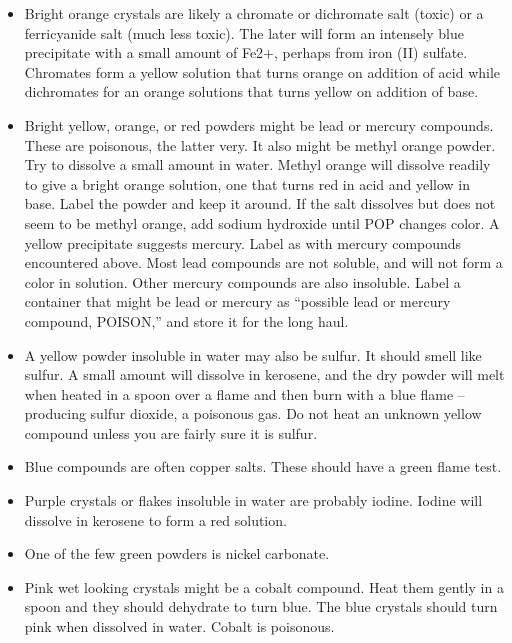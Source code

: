 \begin{itemize}

\item{Bright orange crystals are likely a chromate 
or dichromate salt (toxic) or a ferricyanide salt (much less toxic). 
The later will form an intensely blue precipitate 
with a small amount of Fe2+, 
perhaps from iron (II) sulfate. 
Chromates form a yellow solution that turns orange 
on addition of acid while dichromates for an orange solutions 
that turns yellow on addition of base.}

\item{Bright yellow, 
orange, 
or red powders might be lead or mercury compounds. 
These are poisonous, 
the latter very. 
It also might be methyl orange powder. 
Try to dissolve a small amount in water. 
Methyl orange will dissolve readily to give a bright orange solution, 
one that turns red in acid and yellow in base. 
Label the powder and keep it around. 
If the salt dissolves but does not seem to be methyl orange, 
add sodium hydroxide until POP changes color. 
A yellow precipitate suggests mercury. 
Label as with mercury compounds encountered above. 
Most lead compounds are not soluble, 
and will not form a color in solution. 
Other mercury compounds are also insoluble. 
Label a container that might be lead or mercury as 
“possible lead or mercury compound, 
POISON,” and store it for the long haul.}

\item{A yellow powder insoluble in water may also be sulfur. 
It should smell like sulfur. 
A small amount will dissolve in kerosene, 
and the dry powder will melt when heated in a spoon 
over a flame and then burn with a blue flame – 
producing sulfur dioxide, 
a poisonous gas. 
Do not heat an unknown yellow compound 
unless you are fairly sure it is sulfur.}

\item{Blue compounds are often copper salts. 
These should have a green flame test.}

\item{Purple crystals or flakes insoluble in water are probably iodine. 
Iodine will dissolve in kerosene to form a red solution.}

\item{One of the few green powders is nickel carbonate.}

\item{Pink wet looking crystals might be a cobalt compound. 
Heat them gently in a spoon and they should dehydrate to turn blue. 
The blue crystals should turn pink when dissolved in water. 
Cobalt is poisonous.}


\end{itemize}
